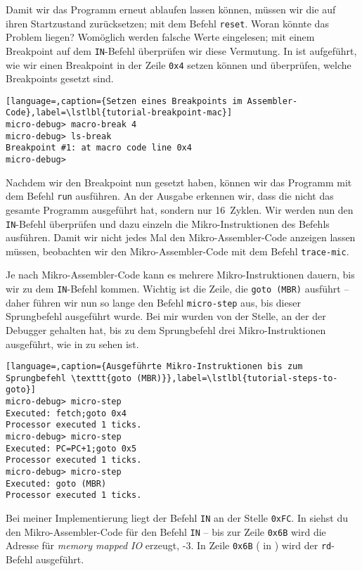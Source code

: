 Damit wir das Programm erneut ablaufen lassen können, müssen wir die \mic auf ihren Startzustand zurücksetzen; mit dem Befehl \texttt{reset}. Woran könnte das Problem liegen? Womöglich werden falsche Werte eingelesen; mit einem Breakpoint auf dem \texttt{IN}-Befehl überprüfen wir diese Vermutung. In  ist aufgeführt, wie wir einen Breakpoint in der Zeile \texttt{0x4} setzen können und überprüfen, welche Breakpoints gesetzt sind.

\begin{lstlisting}[language=,caption={Setzen eines Breakpoints im Assembler-Code},label=\lstlbl{tutorial-breakpoint-mac}]
micro-debug> macro-break 4
micro-debug> ls-break
Breakpoint #1: at macro code line 0x4
micro-debug> 
\end{lstlisting}

Nachdem wir den Breakpoint nun gesetzt haben, können wir das Programm mit dem Befehl \texttt{run} ausführen. An der Ausgabe erkennen wir, dass die \mic nicht das gesamte Programm ausgeführt hat, sondern nur 16~Zyklen. Wir werden nun den \texttt{IN}-Befehl überprüfen und dazu einzeln die Mikro-Instruktionen des Befehls ausführen. Damit wir nicht jedes Mal den Mikro-Assembler-Code anzeigen lassen müssen, beobachten wir den Mikro-Assembler-Code mit dem Befehl \texttt{trace-mic}.

Je nach Mikro-Assembler-Code kann es mehrere Mikro-Instruktionen dauern, bis wir zu dem \texttt{IN}-Befehl kommen. Wichtig ist die Zeile, die \texttt{goto (MBR)} ausführt -- daher führen wir nun so lange den Befehl \texttt{micro-step} aus, bis dieser Sprungbefehl ausgeführt wurde. Bei mir wurden von der Stelle, an der der Debugger gehalten hat, bis zu dem Sprungbefehl drei Mikro-Instruktionen ausgeführt, wie in  zu sehen ist.

\begin{lstlisting}[language=,caption={Ausgeführte Mikro-Instruktionen bis zum Sprungbefehl \texttt{goto (MBR)}},label=\lstlbl{tutorial-steps-to-goto}]
micro-debug> micro-step
Executed: fetch;goto 0x4
Processor executed 1 ticks.
micro-debug> micro-step
Executed: PC=PC+1;goto 0x5
Processor executed 1 ticks.
micro-debug> micro-step
Executed: goto (MBR)
Processor executed 1 ticks.
\end{lstlisting}

Bei meiner Implementierung liegt der Befehl \texttt{IN} an der Stelle \texttt{0xFC}. In  siehst du den Mikro-Assembler-Code für den Befehl \texttt{IN} -- bis zur Zeile \texttt{0x6B} wird die Adresse für \emph{memory mapped IO} erzeugt, -3. In Zeile \texttt{0x6B} ( in ) wird der \texttt{rd}-Befehl ausgeführt.

